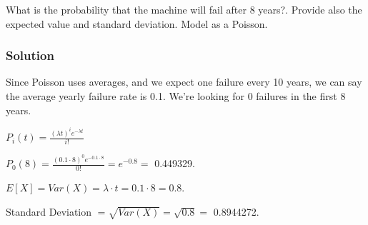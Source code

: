 \documentclass[]{article}
\newenvironment{Shaded}{\begin{snugshade}}{\end{snugshade}}
\newcommand{\KeywordTok}[1]{\textcolor[rgb]{0.13,0.29,0.53}{\textbf{#1}}}
\newcommand{\DecValTok}[1]{\textcolor[rgb]{0.00,0.00,0.81}{#1}}
\newcommand{\FloatTok}[1]{\textcolor[rgb]{0.00,0.00,0.81}{#1}}
\newcommand{\CharTok}[1]{\textcolor[rgb]{0.31,0.60,0.02}{#1}}
\newcommand{\StringTok}[1]{\textcolor[rgb]{0.31,0.60,0.02}{#1}}
\newcommand{\OperatorTok}[1]{\textcolor[rgb]{0.81,0.36,0.00}{\textbf{#1}}}
\newcommand{\NormalTok}[1]{#1}
\begin{document}
What is the probability that the machine will fail after 8 years?.
Provide also the expected value and standard deviation. Model as a
Poisson.

\subsubsection{Solution}\label{solution-4}

Since Poisson uses averages, and we expect one failure every 10 years,
we can say the average yearly failure rate is 0.1. We're looking for 0
failures in the first 8 years.

\(P_{i}(t) = \frac{(\lambda t)^{i}e^{-\lambda t}}{i!}\)

\(P_{0}(8) = \frac{(0.1\cdot 8)^{0}e^{-0.1\cdot 8}}{0!} = e^{-0.8} =\)
0.449329.

\(E[X] = Var(X) = \lambda\cdot t = 0.1 \cdot 8 = 0.8\).

Standard Deviation \(= \sqrt{Var(X)} = \sqrt{0.8} =\) 0.8944272.

\begin{Shaded}
\end{Shaded}
\end{document}
